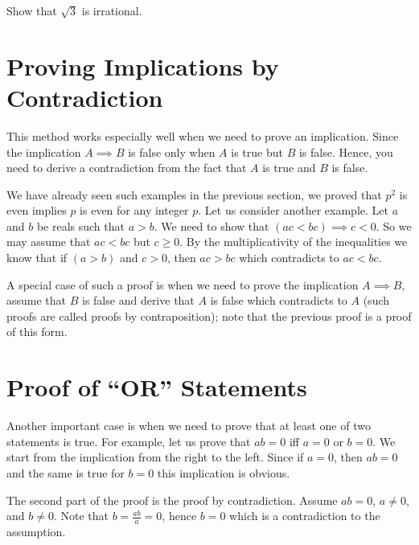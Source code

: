 \begin{exercise}
  Show that $\sqrt{3}$ is irrational.
\end{exercise}

\section{Proving Implications by Contradiction}
This method works especially well when we need to prove an implication.
Since the implication $A \implies B$ is false only when $A$ is true but $B$ is
false. Hence, you need to derive a contradiction from the fact that $A$ is true
and $B$ is false.

We have already seen such examples in the previous section, we proved that
$p^2$ is even implies $p$ is even for any integer $p$. Let us consider another
example. Let $a$ and $b$ be reals such that $a > b$. We need to show that
$(ac < bc) \implies c < 0$. So we may assume that $ac < bc$ but $c \ge 0$. By
the multiplicativity of the inequalities we know that if $(a > b)$ and $c > 0$,
then $ac > bc$ which contradicts to $ac < bc$.

A special case of such a proof is when we need to prove the implication
$A \implies B$, assume that $B$ is false and derive that $A$ is false which
contradicts to  $A$ (such proofs are called proofs by contraposition); note
that the previous proof is a proof of this form.

\section{Proof of ``OR'' Statements}
Another important case is when we need to prove that at least one of two
statements is true. For example, let us prove that $ab = 0$ iff $a = 0$ or
$b = 0$. We start from the implication from the right to the left. Since if
$a = 0$, then $ab = 0$ and the same is true for $b = 0$ this implication is
obvious.

The second part of the proof is the proof by contradiction. Assume $ab = 0$,
$a \neq 0$, and $b \neq 0$. Note that $b = \frac{ab}{a} = 0$,
hence $b = 0$ which is a contradiction to the assumption.

